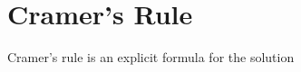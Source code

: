 \documentclass[letterpaper,12pt]{article}
\begin{document}
\section*{Cramer's Rule}
Cramer's rule is an explicit formula for the solution 
\end{document}
